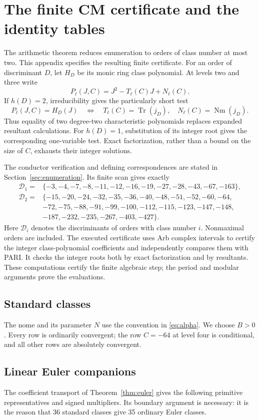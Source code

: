 \section{The finite CM certificate and the identity tables}
\label{app:cm-certificate}

The arithmetic theorem reduces enumeration to orders of class number at
most two. This appendix specifies the resulting finite certificate.
For an order of discriminant $D$, let $H_D$ be its monic ring class
polynomial. At levels two and three write
\[
 P_\ell(J,C)=J^2-T_\ell(C)J+N_\ell(C).
\]
If $h(D)=2$, irreducibility gives the particularly short test
\[
 P_\ell(J,C)=H_D(J)
 \quad\Longleftrightarrow\quad
 T_\ell(C)=\operatorname{Tr}(j_D),\quad
 N_\ell(C)=\operatorname{Nm}(j_D).
\]
Thus equality of two degree-two characteristic polynomials replaces
expanded resultant calculations. For $h(D)=1$, substitution of its
integer root gives the corresponding one-variable test. Exact
factorization, rather than a bound on the size of $C$, exhausts their
integer solutions.

The conductor verification and defining correspondences are stated in
Section~\ref{sec:enumeration}. Its finite scan gives exactly
\begin{align*}
\mathcal D_1={}&\{-3,-4,-7,-8,-11,-12,-16,-19,-27,-28,-43,-67,-163\},\\
\mathcal D_2={}&\{-15,-20,-24,-32,-35,-36,-40,-48,-51,-52,-60,-64,\\
&-72,-75,-88,-91,-99,-100,-112,-115,-123,-147,-148,\\
&-187,-232,-235,-267,-403,-427\}.
\end{align*}
Here $\mathcal D_i$ denotes the discriminants of orders with class number
$i$. Nonmaximal orders are included.
The executed certificate uses Arb complex intervals to certify the
integer class-polynomial coefficients and independently compares them
with PARI. It checks the integer roots both by exact factorization and
by resultants. These computations certify the finite algebraic step;
the period and modular arguments prove the evaluations.



\subsection{Standard classes}
The nome and its parameter $N$ use the convention in
\eqref{eq:alpha}. We choose $B>0$. Every row is ordinarily convergent;
the row $C=-64$ at level four is conditional, and all other rows are
absolutely convergent.



\subsection{Linear Euler companions}
The coefficient transport of Theorem~\ref{thm:euler} gives the following
primitive representatives and signed multipliers. Its boundary argument
is necessary: it is the reason that 36 standard classes give 35
ordinary Euler classes.


